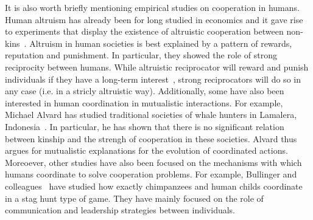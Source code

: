     It is also worth briefly mentioning empirical studies on cooperation in humans. Human altruism has already been for long studied in economics and it gave rise to experiments that display the existence of altruistic cooperation between non-kins~\parencite{Fehr2002, Fehr2003a}. Altruism in human societies is best explained by a pattern of rewards, reputation and punishment. In particular, they showed the role of strong reciprocity between humans. While altruistic reciprocator will reward and punish individuals if they have a long-term interest~\parencite{Trivers1971}, strong reciprocators will do so in any case (i.e. in a stricly altruistic way). Additionally, some have also been interested in human coordination in mutualistic interactions. For example, Michael Alvard has studied traditional societies of whale hunters in Lamalera, Indonesia~\parencite{Alvard1999, Alvard2003}. In particular, he has shown that there is no significant relation between kinship and the strengh of cooperation in these societies. Alvard thus argues for mutualistic explanations for the evolution of coordinated actions. Moreoever, other studies have also been focused on the mechanisms with which humans coordinate to solve cooperation problems. For example, Bullinger and colleagues~\parencite{Bullinger2011, Duguid2014} have studied how exactly chimpanzees and human childs coordinate in a stag hunt type of game. They have mainly focused on the role of communication and leadership strategies between individuals.


